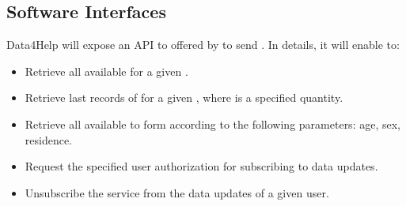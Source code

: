 \documentclass[../../../rasd.tex]{subfiles}
\begin{document}
\subsection{Software Interfaces}
			Data4Help will expose an API to  offered by  to send . In details, it will enable to:
			\begin{itemize}
				\item Retrieve all  available for a given .
				\item Retrieve last  records of  for a given , where  is a specified quantity.
				\item Retrieve all  available to form  according to the following parameters: age, sex, residence.
				\item Request the specified user authorization for subscribing to data updates.
				\item Unsubscribe the service from the data updates of a given user.
			\end{itemize}
\end{document}
